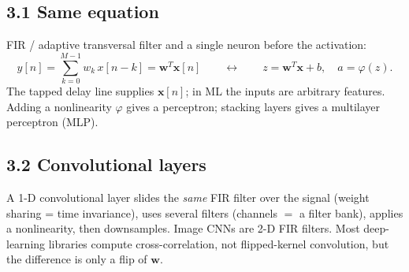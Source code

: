 \documentclass[11pt,a4paper]{article}
\begin{document}
\subsection{3.1 Same equation}
FIR / adaptive transversal filter and a single neuron before the activation:
\begin{equation}
y[n] = \sum_{k=0}^{M-1} w_k\,x[n-k] = \mathbf{w}^T\mathbf{x}[n] \qquad\longleftrightarrow\qquad z = \mathbf{w}^T\mathbf{x} + b,\quad a = \varphi(z).
\end{equation}
The tapped delay line supplies $\mathbf{x}[n]$; in ML the inputs are arbitrary features. Adding a nonlinearity $\varphi$ gives a perceptron; stacking layers gives a multilayer perceptron (MLP).

\subsection{3.2 Convolutional layers}
A 1-D convolutional layer slides the \emph{same} FIR filter over the signal (weight sharing = time invariance), uses several filters (channels $=$ a filter bank), applies a nonlinearity, then downsamples. Image CNNs are 2-D FIR filters. Most deep-learning libraries compute cross-correlation, not flipped-kernel convolution, but the difference is only a flip of $\mathbf{w}$.
\end{document}
